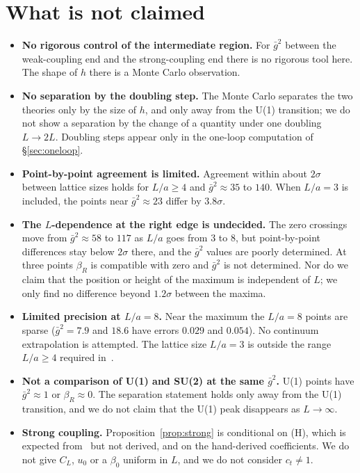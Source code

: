 \documentclass[11pt,a4paper]{article}
\theoremstyle{definition}
\theoremstyle{remark}
\newcommand{\gb}{\bar g^{2}}
\newcommand{\bR}{\beta_R}
\begin{document}
\section{What is not claimed}\label{sec:notclaimed}

\begin{itemize}[leftmargin=2em]
\item \textbf{No rigorous control of the intermediate region.} For $\gb$ between the weak-coupling end and the strong-coupling end there is no rigorous tool here. The shape of $h$ there is a Monte Carlo observation.
\item \textbf{No separation by the doubling step.} The Monte Carlo separates the two theories only by the size of $h$, and only away from the U(1) transition; we do not show a separation by the change of a quantity under one doubling $L\to2L$. Doubling steps appear only in the one-loop computation of \S\ref{sec:oneloop}.
\item \textbf{Point-by-point agreement is limited.} Agreement within about $2\sigma$ between lattice sizes holds for $L/a\ge4$ and $\gb\approx35$ to $140$. When $L/a=3$ is included, the points near $\gb\approx23$ differ by $3.8\sigma$.
\item \textbf{The $L$-dependence at the right edge is undecided.} The zero crossings move from $\gb\approx58$ to $117$ as $L/a$ goes from $3$ to $8$, but point-by-point differences stay below $2\sigma$ there, and the $\gb$ values are poorly determined. At three points $\bR$ is compatible with zero and $\gb$ is not determined. Nor do we claim that the position or height of the maximum is independent of $L$; we only find no difference beyond $1.2\sigma$ between the maxima.
\item \textbf{Limited precision at $L/a=8$.} Near the maximum the $L/a=8$ points are sparse ($\gb=7.9$ and $18.6$ have errors $0.029$ and $0.054$). No continuum extrapolation is attempted. The lattice size $L/a=3$ is outside the range $L/a\ge4$ required in~\cite{LNWW,LSWW}.
\item \textbf{Not a comparison of U(1) and SU(2) at the same $\gb$.} U(1) points have $\gb\approx1$ or $\bR\approx0$. The separation statement holds only away from the U(1) transition, and we do not claim that the U(1) peak disappears as $L\to\infty$.
\item \textbf{Strong coupling.} Proposition~\ref{prop:strong} is conditional on (H), which is expected from~\cite{OS} but not derived, and on the hand-derived coefficients. We do not give $C_L$, $u_0$ or a $\beta_0$ uniform in $L$, and we do not consider $c_t\ne1$.

\end{itemize}
\end{document}
